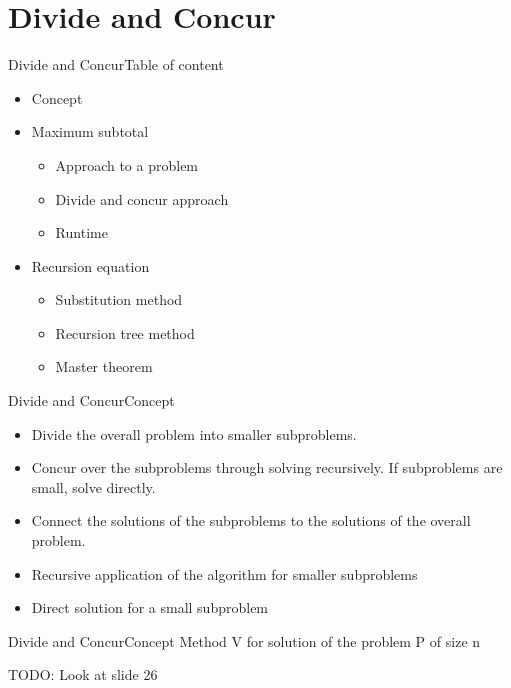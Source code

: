 \section{Divide and Concur}



\begin{frame}{Divide and Concur}{Table of content}
	\begin{itemize}
		\item
			Concept
		\item
			Maximum subtotal
		\begin{itemize}
			\item
				Approach to a problem
			\item
				Divide and concur approach
			\item
				Runtime
		\end{itemize}
		\item
			Recursion equation
		\begin{itemize}
			\item
				Substitution method
			\item
				Recursion tree method
			\item
				Master theorem
		\end{itemize}
	\end{itemize}
\end{frame}


\begin{frame}{Divide and Concur}{Concept}
	\begin{itemize}
		\item
			Divide the overall problem into smaller subproblems.
		\item
			Concur over the subproblems through solving recursively. If subproblems 
			are small, solve directly.
		\item
			Connect the solutions of the subproblems to the solutions of the 
			overall problem.
		\item
			Recursive application of the algorithm for smaller subproblems 
		\item
			Direct solution for a small subproblem
	\end{itemize}
\end{frame}


\begin{frame}{Divide and Concur}{Concept}
	Method V for solution of the problem P of size n
	
	TODO: Look at slide 26 \vspace{2em}
	
\end{frame}

